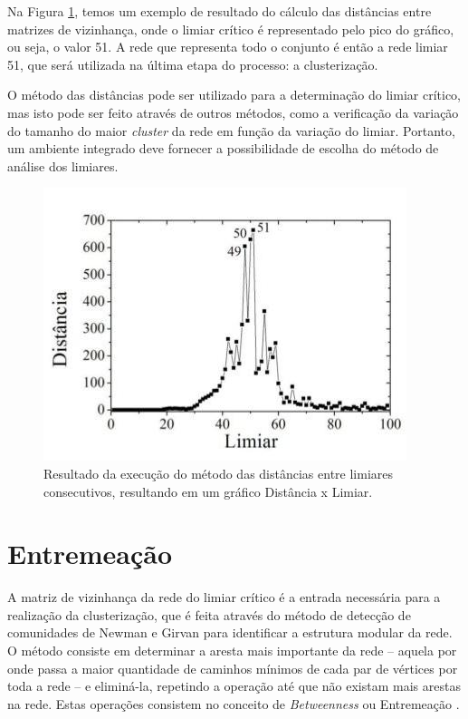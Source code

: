 Na Figura \ref{fig:distancia}, temos um exemplo de resultado do cálculo das distâncias entre matrizes de vizinhança, onde o limiar crítico é representado
pelo pico do gráfico, ou seja, o valor 51. A rede que representa todo o conjunto é então a rede limiar 51, que será utilizada na última etapa do processo:
a clusterização.

O método das distâncias pode ser utilizado para a determinação do limiar crítico, mas isto pode ser feito através de outros métodos, como a verificação da
variação do tamanho do maior \textit{cluster} da rede em função da variação do limiar. Portanto, um ambiente integrado deve fornecer a possibilidade de
escolha do método de análise dos limiares.

\begin{figure}
\centering
\includegraphics[scale=0.58]{distancia}
\caption{Resultado da execução do método das distâncias entre limiares consecutivos, resultando em um gráfico Distância x Limiar.}
\label{fig:distancia}
\end{figure}

\section{Entremeação} \label{sec:entremeacao}

A matriz de vizinhança da rede do limiar crítico é a entrada necessária para a realização da clusterização, que é feita através do método de detecção
de comunidades de Newman e Girvan \cite{newman2004} para identificar a estrutura modular da rede. O método consiste em determinar a aresta mais importante
da rede – aquela por onde passa a maior quantidade de caminhos mínimos de cada par de vértices por toda a rede – e eliminá-la, repetindo a operação
até que não existam mais arestas na rede. Estas operações consistem no conceito de \textit{Betweenness} ou Entremeação \cite{andrade2008}.

